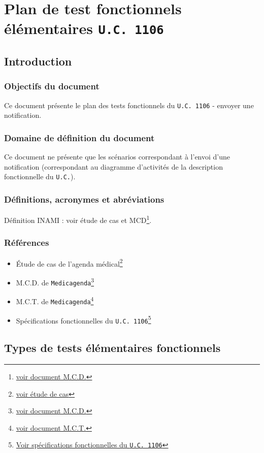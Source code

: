\chapter{Plan de test fonctionnels élémentaires \texttt{U.C. 1106}}
\section{Introduction}
\subsection{Objectifs du document}
Ce document présente le plan des tests fonctionnels du \texttt{U.C. 1106} -
envoyer une notification. 
\subsection{Domaine de définition du document}
Ce document ne présente que les scénarios correspondant à l'envoi d’une
notification (correspondant au diagramme d’activités de la description 
fonctionnelle du \texttt{U.C.}).
\subsection{Définitions, acronymes et abréviations}
Définition INAMI : voir étude de cas et MCD\footnote{\href{../MCD/MCD.pdf}{voir document M.C.D.}}.
\subsection{Références}
\begin{itemize}
	\item[] Étude de cas de l'agenda
		médical\footnote{\href{../Enonce_Travail_Synthese_14-15.pdf}{voir
		étude de cas}}
	\item[] M.C.D. de \texttt{Medicagenda}\footnote{\href{../MCD/MCD.pdf}{voir document M.C.D.}}
	\item[] M.C.T. de \texttt{Medicagenda}\footnote{\href{./MCT.pdf}{voir document M.C.T.}}
	\item[] Spécifications fonctionnelles du \texttt{U.C.
		1106}\footnote{\href{./specifications_fonctionnelles_UC_1106_envoyer_une_notification.pdf}{Voir
			spécifications fonctionnelles du \texttt{U.C. 1106}}}
	\end{itemize}

	\section{Types de tests élémentaires fonctionnels}
